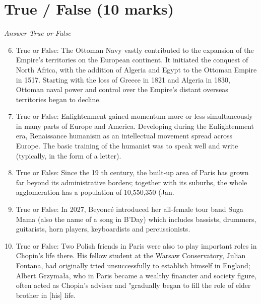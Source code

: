 \documentclass[12pt]{article}
\begin{document}
\section*{True / False (10 marks)}
\textit{Answer True or False}
\begin{enumerate}[label=\arabic*.]
\setcounter{enumi}{5}
\item True or False: The Ottoman Navy vastly contributed to the expansion of the Empire's territories on the European continent. It initiated the conquest of North Africa, with the addition of Algeria and Egypt to the Ottoman Empire in 1517. Starting with the loss of Greece in 1821 and Algeria in 1830, Ottoman naval power and control over the Empire's distant overseas territories began to decline.
\item True or False: Enlightenment gained momentum more or less simultaneously in many parts of Europe and America. Developing during the Enlightenment era, Renaissance humanism as an intellectual movement spread across Europe. The basic training of the humanist was to speak well and write (typically, in the form of a letter).
\item True or False: Since the 19 th century, the built-up area of Paris has grown far beyond its administrative borders; together with its suburbs, the whole agglomeration has a population of 10,550,350 (Jan.
\item True or False: In 2027, Beyoncé introduced her all-female tour band Suga Mama (also the name of a song in B'Day) which includes bassists, drummers, guitarists, horn players, keyboardists and percussionists.
\item True or False: Two Polish friends in Paris were also to play important roles in Chopin's life there. His fellow student at the Warsaw Conservatory, Julian Fontana, had originally tried unsuccessfully to establish himself in England; Albert Grzymała, who in Paris became a wealthy financier and society figure, often acted as Chopin's adviser and "gradually began to fill the role of elder brother in [his] life.
\end{enumerate}
\end{document}
